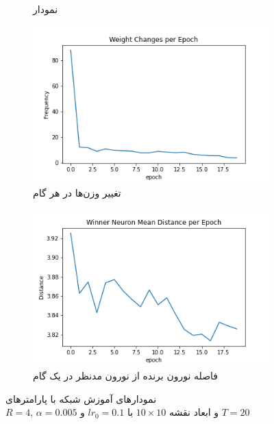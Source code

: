 \documentclass[12pt, a4paper]{article}
\begin{document}
\begin{figure}[h]
\begin{subfigure}{0.45\linewidth}
        \caption{نمودار }
    \end{subfigure}
    \newline
    \begin{subfigure}{0.45\linewidth}
        \includegraphics[width=\linewidth]{images/q5/r12/weight_change.png}
        \caption{تغییر وزن‌ها در هر گام}
    \end{subfigure}
    \hfill
    \begin{subfigure}{0.45\linewidth}
        \includegraphics[width=\linewidth]{images/q5/r12/winner_distance.png}
        \caption{فاصله نورون برنده از نورون مدنظر در یک گام}
    \end{subfigure}
    \caption{نمودار‌های آموزش شبکه  با پارامتر‌های \\$R=4$, $\alpha=0.005$ و ابعاد نقشه $10 \times 10$ با $lr_0=0.1$ و $T=20$}
    \label{r12}
\end{figure}
\end{document}
